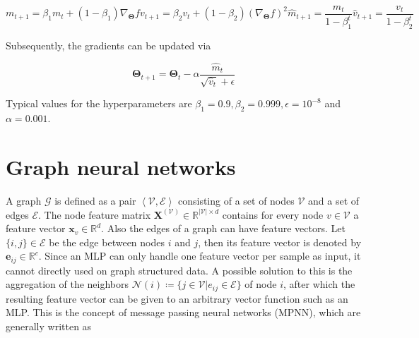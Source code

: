\begin{subequations}
	\begin{equation}
		m_{t+1} = \beta_1 m_t + (1 - \beta_1) \nabla_{\pmb{\Theta}} f
	\end{equation}
	\begin{equation}
		v_{t+1} = \beta_2 v_t + (1 - \beta_2) \left( \nabla_{\pmb{\Theta}} f \right)^2
	\end{equation}
	\begin{equation}
		\hat{m}_{t+1} = \frac{m_t}{1 - \beta^t_1}
	\end{equation}
	\begin{equation}
		\hat{v}_{t+1} = \frac{v_t}{1 - \beta^t_2}
	\end{equation}
\end{subequations}


Subsequently, the gradients can be updated via


\begin{equation}
	\pmb{\Theta}_{t+1} = \pmb{\Theta}_t - \alpha \frac{\hat{m}_t}{\sqrt{\hat{v}_t} + \epsilon}
\end{equation}


Typical values for the hyperparameters are $\beta_1 = 0.9, \beta_2 = 0.999, \epsilon = 10^{-8}$
and $\alpha = 0.001$.


\section{Graph neural networks}


A graph $\mathcal{G}$ is defined as a pair $\left<\mathcal{V}, \mathcal{E}\right>$
consisting of a set of nodes $\mathcal{V}$ and a set of edges $\mathcal{E}$.
The node feature matrix $\pmb{X}^{(\mathcal{V})} \in \mathbb{R}^{|\mathcal{V}| \times d}$
contains for every node $v \in \mathcal{V}$ a feature vector $\pmb{x}_v \in \mathbb{R}^d$.
Also the edges of a graph can have feature vectors. Let $\{i,j\} \in \mathcal{E}$ be
the edge between nodes $i$ and $j$, then its feature vector is denoted by
$\pmb{e}_{ij} \in \mathbb{R}^c$.\cite{wu2020comprehensive}
Since an MLP can only handle one feature vector per sample as input, it
cannot directly used on graph structured data. A possible solution to this
is the aggregation of the neighbors $\mathcal{N}(i) \coloneqq \{j \in \mathcal{V} | e_{ij} \in \mathcal{E}\}$ of node $i$,
after which the resulting feature vector can be given to an arbitrary vector function
such as an MLP. This is the concept of message passing neural networks (MPNN), which
are generally written as\cite{gilmer2017neural}


